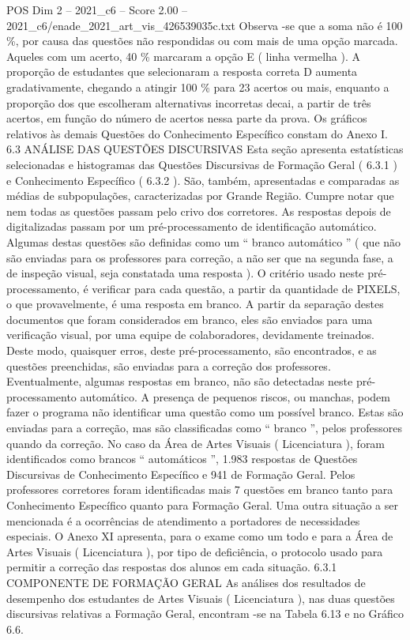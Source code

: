 \begin{textsample}{POS Dim 2 – 2021\_c6 – Score 2.00 – 2021\_c6/enade\_2021\_art\_vis\_426539035c.txt}
Observa -se que a soma não é 100 \%, por causa das questões não respondidas ou com mais de uma opção marcada.
Aqueles com um acerto, 40 \% marcaram a opção E ( linha vermelha ).
A proporção de estudantes que selecionaram a resposta correta D aumenta gradativamente, chegando a atingir 100 \% para 23 acertos ou mais, enquanto a proporção dos que escolheram alternativas incorretas decai, a partir de três acertos, em função do número de acertos nessa parte da prova.
Os gráficos relativos às demais Questões do Conhecimento Específico constam do Anexo I. 6.3 ANÁLISE DAS QUESTÕES DISCURSIVAS Esta seção apresenta estatísticas selecionadas e histogramas das Questões Discursivas de Formação Geral ( 6.3.1 ) e Conhecimento Específico ( 6.3.2 ).
São, também, apresentadas e comparadas as médias de subpopulações, caracterizadas por Grande Região.
Cumpre notar que nem todas as questões passam pelo crivo dos corretores.
As respostas depois de digitalizadas passam por um pré-processamento de identificação automático.
Algumas destas questões são definidas como um “ branco automático ” ( que não são enviadas para os professores para correção, a não ser que na segunda fase, a de inspeção visual, seja constatada uma resposta ).
O critério usado neste pré-processamento, é verificar para cada questão, a partir da quantidade de PIXELS, o que provavelmente, é uma resposta em branco.
A partir da separação destes documentos que foram considerados em branco, eles são enviados para uma verificação visual, por uma equipe de colaboradores, devidamente treinados.
Deste modo, quaisquer erros, deste pré-processamento, são encontrados, e as questões preenchidas, são enviadas para a correção dos professores.
Eventualmente, algumas respostas em branco, não são detectadas neste pré-processamento automático.
A presença de pequenos riscos, ou manchas, podem fazer o programa não identificar uma questão como um possível branco.
Estas são enviadas para a correção, mas são classificadas como “ branco ”, pelos professores quando da correção.
No caso da Área de Artes Visuais ( Licenciatura ), foram identificados como brancos “ automáticos ”, 1.983 respostas de Questões Discursivas de Conhecimento Específico e 941 de Formação Geral.
Pelos professores corretores foram identificadas mais 7 questões em branco tanto para Conhecimento Específico quanto para Formação Geral.
Uma outra situação a ser mencionada é a ocorrências de atendimento a portadores de necessidades especiais.
O Anexo XI apresenta, para o exame como um todo e para a Área de Artes Visuais ( Licenciatura ), por tipo de deficiência, o protocolo usado para permitir a correção das respostas dos alunos em cada situação. 6.3.1 COMPONENTE DE FORMAÇÃO GERAL As análises dos resultados de desempenho dos estudantes de Artes Visuais ( Licenciatura ), nas duas questões discursivas relativas a Formação Geral, encontram -se na Tabela 6.13 e no Gráfico 6.6.

\end{textsample}
